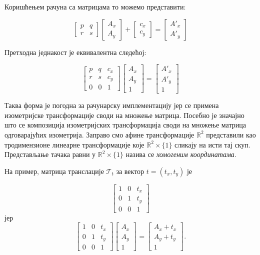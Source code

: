 \documentclass[12pt]{report}
\begin{document}
Коришћењем
рачуна са матрицама то можемо представити:

\[\begin{bmatrix}p & q\\ r & s\end{bmatrix} \begin{bmatrix}A_x\\ A_y \end{bmatrix} + \begin{bmatrix}c_x\\ c_y\end{bmatrix} = \begin{bmatrix}A'_x\\ A'_y \end{bmatrix}\]

Претходна једнакост је еквивалентна следећој:

\[\begin{bmatrix}p & q & c_x\\ r & s&c_y \\ 0 & 0 & 1\end{bmatrix} \begin{bmatrix}A_x\\ A_y\\1\end{bmatrix} = 
\begin{bmatrix}A'_x\\ A'_y\\1\end{bmatrix}\]

Таква форма је погодна за рачунарску имплементацију јер се примена изометријске трансформације своди на  множење матрица. Посебно је значајно што се композиција изометријских трансформација своди на множење матрица одговарајућих изометрија. Заправо смо афине трансформације $\mathbb{R}^2$ представили као тродимензионе линеарне трансформације које $\mathbb{R}^2 \times \{ 1 \}$  сликају на исти тај скуп. Представљање тачака равни у $\mathbb{R}^2 \times \{ 1 \}$ назива се \emph{хомогеним координатама}.

На пример, матрица транслације $\mathcal{T}_t$ за вектор \( t = (t_x, t_y)\) је 

\[\begin{bmatrix}1 & 0 & t_x\\ 0 & 1&t_y \\ 0 & 0 & 1\end{bmatrix} \] 
јер
\[\begin{bmatrix}1 & 0 & t_x\\ 0 & 1&t_y \\ 0 & 0 & 1\end{bmatrix} \begin{bmatrix}A_x\\ A_y\\1\end{bmatrix} = 
\begin{bmatrix}A_x+t_x\\ A_y+t_y\\1\end{bmatrix}.\]
\end{document}
